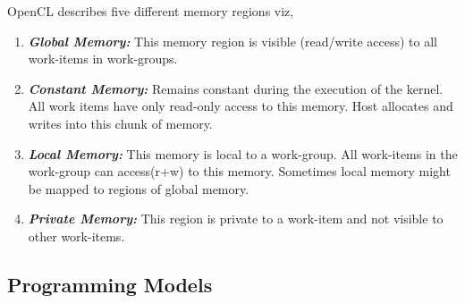 \documentclass[10pt]{article}
\begin{document}
OpenCL describes five different memory regions viz,

\begin{enumerate}
	\item \textit{\textbf{Global Memory:}} This memory region is visible (read/write access) to all work-items in work-groups. 
	\item \textit{\textbf{Constant Memory:}} Remains constant during the execution of the kernel. All work items have only read-only access to this memory. Host allocates and writes into this chunk of memory.
	\item \textit{\textbf{Local Memory:}} This memory is local to a work-group. All work-items in the work-group can access(r+w) to this memory. Sometimes local memory might be mapped to regions of global memory.
	\item \textit{\textbf{Private Memory:}} This region is private to a work-item and not visible to other work-items.
\end{enumerate}


\subsection{Programming Models}
\end{document}
